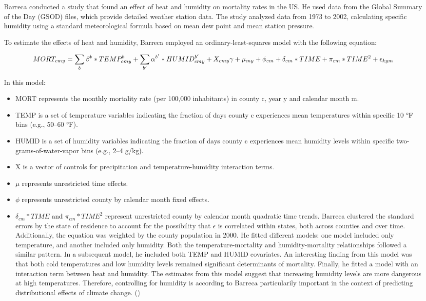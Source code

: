 \documentclass[
]{krantz}
\providecommand{\tightlist}{%
  \setlength{\itemsep}{0pt}\setlength{\parskip}{0pt}}
\begin{document}
Barreca conducted a study that found an effect of heat and humidity on mortality rates in the US. He used data from the Global Summary of the Day (GSOD) files, which provide detailed weather station data. The study analyzed data from 1973 to 2002, calculating specific humidity using a standard meteorological formula based on mean dew point and mean station pressure.

To estimate the effects of heat and humidity, Barreca employed an ordinary-least-squares model with the following equation:

\[
MORT_{cmy} = \sum_b \beta^b*TEMP^b_{cmy} + \sum_{b'} \alpha^{b'} * HUMID^{b'}_{cmy} + X_{cmy} \gamma + \mu_{my} + \\
\phi_{cm} + \delta_{cm} * TIME + \pi_{cm}*TIME^2 + \epsilon_{kym}
\]

In this model:

\begin{itemize}
\tightlist
\item
  MORT represents the monthly mortality rate (per 100,000 inhabitants) in county c, year y and calendar month m.
\item
  TEMP is a set of temperature variables indicating the fraction of days county c experiences mean temperatures within specific 10 °F bins (e.g., 50--60 °F).
\item
  HUMID is a set of humidity variables indicating the fraction of days county c experiences mean humidity levels within specific two-grams-of-water-vapor bins (e.g., 2--4 g/kg).
\item
  X is a vector of controls for precipitation and temperature-humidity interaction terms.
\item
  \(\mu\) represents unrestricted time effects.
\item
  \(\phi\) represents unrestricted county by calendar month fixed effects.
\item
  \(\delta_{cm}*TIME\) and \(\pi_{cm} * TIME^2\) represent unrestricted county by calendar month quadratic time trends.
  Barreca clustered the standard errors by the state of residence to account for the possibility that
  \(\epsilon\) is correlated within states, both across counties and over time. Additionally, the equation was weighted by the county population in 2000.
  He fitted different models: one model included only temperature, and another included only humidity. Both the temperature-mortality and humidity-mortality relationships followed a similar pattern. In a subsequent model, he included both TEMP and HUMID covariates. An interesting finding from this model was that both cold temperatures and low humidity levels remained significant determinants of mortality.
  Finally, he fitted a model with an interaction term between heat and humidity. The estimates from this model suggest that increasing humidity levels are more dangerous at high temperatures.
  Therefore, controlling for humidity is according to Barreca particularily important in the context of predicting distributional effects of climate change. (\citet{barr})
\end{itemize}
\end{document}
